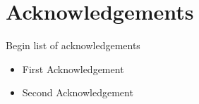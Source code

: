 \documentclass{article}
\begin{document}
\newpage %
\section*{Acknowledgements} %

\noindent Begin list of acknowledgements


\begin{itemize} %
    \item First Acknowledgement %
    \item Second Acknowledgement %
\end{itemize}

\tableofcontents %
\listoftables %
\listoffigures %
\end{document}
